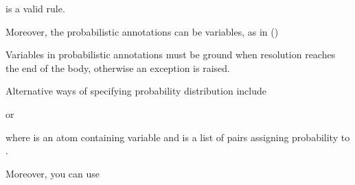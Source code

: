\documentclass[letterpaper,10pt,english]{sphinxmanual}
\begin{document}
\sphinxAtStartPar
is a valid rule.

\sphinxAtStartPar
Moreover, the probabilistic annotations can be variables, as in ()

\begin{sphinxVerbatim}[commandchars=\\\{\}]

 
        
\end{sphinxVerbatim}

\sphinxAtStartPar
Variables in probabilistic annotations must be ground when resolution reaches the end of the body, otherwise an exception is raised.

\sphinxAtStartPar
Alternative ways of specifying probability distribution include

\begin{sphinxVerbatim}[commandchars=\\\{\}]
\end{sphinxVerbatim}

\sphinxAtStartPar
or

\begin{sphinxVerbatim}[commandchars=\\\{\}]
\end{sphinxVerbatim}

\sphinxAtStartPar
where  is an atom containing variable  and  is a list of pairs  assigning probability  to .

\sphinxAtStartPar
Moreover, you can use

\begin{sphinxVerbatim}[commandchars=\\\{\}]
\end{sphinxVerbatim}
\end{document}
